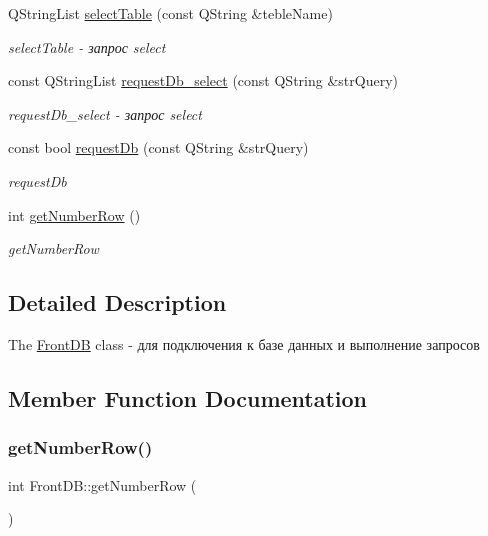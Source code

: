 \begin{DoxyCompactItemize}
Q\+String\+List \hyperlink{classFrontDB_a310f18bfa2665bd435834982f32b8b43}{select\+Table} (const Q\+String \&teble\+Name)
\begin{DoxyCompactList}\small\item\em select\+Table -\/ запрос select \end{DoxyCompactList}\item 
const Q\+String\+List \hyperlink{classFrontDB_a7cb7bf22db3101bdb02a8f68c0379ee3}{request\+Db\+\_\+select} (const Q\+String \&str\+Query)
\begin{DoxyCompactList}\small\item\em request\+Db\+\_\+select -\/ запрос select \end{DoxyCompactList}\item 
const bool \hyperlink{classFrontDB_a731b840c8c44ef003f98abbee2742895}{request\+Db} (const Q\+String \&str\+Query)
\begin{DoxyCompactList}\small\item\em request\+Db \end{DoxyCompactList}\item 
int \hyperlink{classFrontDB_ae0f6e2cc301531b790278a517a74b91a}{get\+Number\+Row} ()
\begin{DoxyCompactList}\small\item\em get\+Number\+Row \end{DoxyCompactList}\end{DoxyCompactItemize}


\subsection{Detailed Description}
The \hyperlink{classFrontDB}{Front\+DB} class -\/ для подключения к базе данных и выполнение запросов 

\subsection{Member Function Documentation}
\mbox{\label{classFrontDB_ae0f6e2cc301531b790278a517a74b91a}} 
\subsubsection{\texorpdfstring{get\+Number\+Row()}{getNumberRow()}}
{\footnotesize\ttfamily int Front\+D\+B\+::get\+Number\+Row (\begin{DoxyParamCaption}{ }\end{DoxyParamCaption})}



